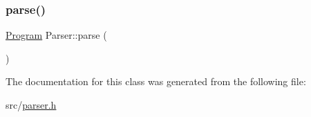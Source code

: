 \subsubsection{\texorpdfstring{parse()}{parse()}}
{\footnotesize\ttfamily \hyperlink{structast_1_1_program}{Program} Parser\+::parse (\begin{DoxyParamCaption}{ }\end{DoxyParamCaption})\hspace{0.3cm}{\ttfamily [inline]}}



The documentation for this class was generated from the following file\+:\begin{DoxyCompactItemize}
\item 
src/\hyperlink{parser_8h}{parser.\+h}\end{DoxyCompactItemize}
